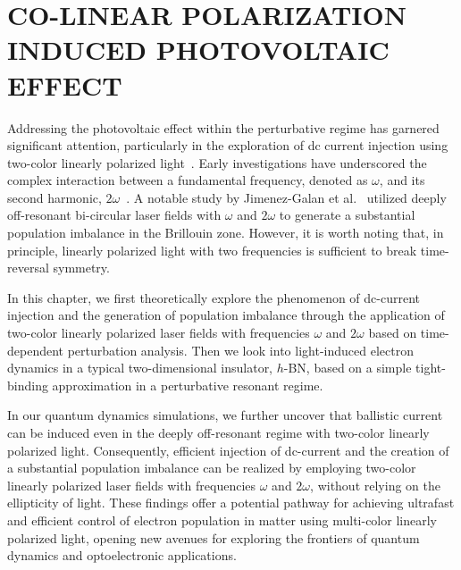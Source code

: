 \chapter{CO-LINEAR POLARIZATION INDUCED PHOTOVOLTAIC EFFECT \label{ch:ch3}} 
Addressing the photovoltaic effect within the perturbative regime has garnered significant
attention, particularly in the exploration of dc current injection using two-color linearly
polarized light~\cite{PhysRevLett.74.3596,PhysRevLett.76.1703,PhysRevLett.78.306,Sun2010,PhysRevB.100.075202,HeideBoolakeeEcksteinHommelhoff+2021+3701+3707,PhysRevLett.123.067402}.
Early investigations have underscored the complex interaction between a fundamental frequency, denoted as $\omega$, and its second harmonic, $2\omega$~\cite{PhysRevLett.74.3596,PhysRevLett.76.1703,PhysRevLett.78.306}. 
A notable study by Jimenez-Galan et al.~\cite{Jimenez-Galan2020} utilized deeply off-resonant bi-circular laser fields with $\omega$ and $2\omega$ to generate a substantial population imbalance in the Brillouin zone. However, it is worth noting that, in principle, linearly polarized light with two frequencies is sufficient to break time-reversal symmetry.

In this chapter, we first theoretically explore the phenomenon of dc-current injection and the
generation of population imbalance through the application of two-color linearly polarized laser
fields with frequencies $\omega$ and $2\omega$ based on time-dependent perturbation analysis.
Then we look into light-induced electron dynamics in a typical two-dimensional insulator, $h$-BN, based on a simple tight-binding approximation in a perturbative resonant regime.

In our quantum dynamics simulations, we further uncover that ballistic current can be induced even
in the deeply off-resonant regime with two-color linearly polarized light.  Consequently, efficient
injection of dc-current and the creation of a substantial population imbalance can be realized by
employing two-color linearly polarized laser fields with frequencies $\omega$ and $2\omega$,
without relying on the ellipticity of light. These findings offer a potential pathway for achieving
ultrafast and efficient control of electron population in matter using multi-color linearly
polarized light, opening new avenues for exploring the frontiers of quantum dynamics and
optoelectronic applications. 

